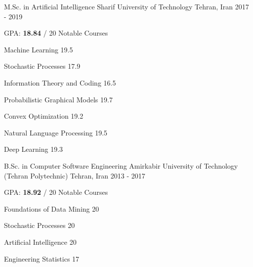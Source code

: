 \begin{cventries}
	\cventry
	{M.Sc. in Artificial Intelligence} %
	{Sharif University of Technology} %
	{Tehran, Iran} %
	{2017 - 2019} %
	{
		GPA: \textbf{18.84} / 20
		\newline
		\textcolor{awesome}{Notable Courses}
		\vspace{-.4cm}
		\begin{multicols}{3}
			\begin{cvitems}
				\item {Machine Learning\hspace{0.5cm} 19.5}
				\item {Stochastic Processes \hspace{0.5cm} 17.9}
				\item {Information Theory and Coding \hspace{0.5cm} 16.5}
				\item {Probabilistic Graphical Models \hspace{0.5cm} 19.7}
				\item {Convex Optimization \hspace{0.5cm} 19.2}
				\item {Natural Language Processing \hspace{0.5cm} 19.5}
				\item {Deep Learning \hspace{0.5cm} 19.3}
			\end{cvitems}
		\end{multicols}
	}
    \vspace{-.5cm}
	\cventry
	{B.Sc. in Computer Software Engineering} %
	{Amirkabir University of Technology {\scriptsize (Tehran Polytechnic)}} %
	{Tehran, Iran} %
	{2013 - 2017} %
	{
		GPA: \textbf{18.92} / 20
		\newline
		\textcolor{awesome}{Notable Courses}
		\vspace{-.4cm}
		\begin{multicols}{3}
			\begin{cvitems}
				\item {Foundations of Data Mining \hspace{0.5cm} 20}
				\item {Stochastic Processes \hspace{0.5cm} 20}
				\item {Artificial Intelligence \hspace{0.5cm} 20}
				\item {Engineering Statistics \hspace{0.5cm} 17}
			\end{cvitems}
		\end{multicols}
	}
    \vspace{-1cm}
\end{cventries}
